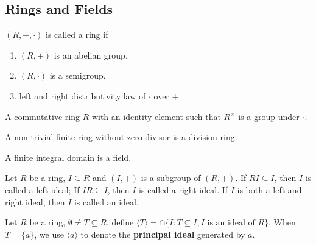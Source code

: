 \documentclass[11pt,fleqn]{book} %
\begin{document}
\begin{CJK}{UTF8}{gkai}
\chapter{Rings and Fields}
\begin{definition}
	[ring] $(R,+,\cdot)$ is called a ring if 
	\begin{enumerate}
		\item $(R, +)$ is an abelian group.
		\item $(R, \cdot)$ is a semigroup.
		\item left and right distributivity law of $\cdot$ over $+$.
	\end{enumerate}
\end{definition}


\begin{definition}
\end{definition}

\begin{definition}
	[field] A commutative ring $R$ with an identity element such that $R^{\times}$ is a group under $\cdot$.
\end{definition}

\begin{theorem}
	A non-trivial finite ring without zero divisor is a division ring.
\end{theorem}

\begin{corollary}
	A finite integral domain is a field.	
\end{corollary}

\begin{definition}
\end{definition}

\begin{definition}
	 Let $R$ be a ring, $I \subseteq R$ and $(I, +)$ is a subgroup of $(R, +)$. 
	If $RI \subseteq I$, then $I$ is called a left ideal; If $IR \subseteq I$, then $I$ is called a right ideal.
	If $I$ is both a left and right ideal, then $I$ is called an ideal.
\end{definition}

\begin{definition}
	 Let $R$ be a ring, $\emptyset \neq T \subseteq R$, define $\langle T\rangle = \cap \{I : T \subseteq I, I \text{ is an ideal of } R\} $.
	When $T = \{a\}$, we use $\langle a \rangle$ to denote the {\bf principal ideal} generated by $a$.
\end{definition}


\end{CJK}
\end{document}
